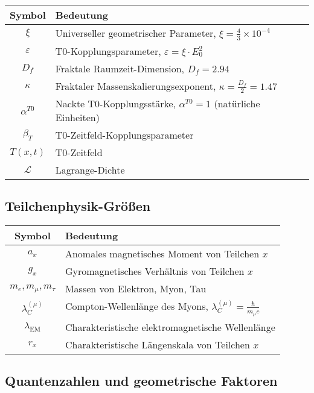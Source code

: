 \documentclass[12pt,a4paper]{article}
\numberwithin{equation}{section}
\newcommand{\xipar}{\xi}
\newcommand{\epsilonT}{\varepsilon}
\newcommand{\alphaT}{\alpha^{T0}}
\newcommand{\kappaT}{\kappa}
\newcommand{\calL}{\mathcal{L}}
\newcommand{\Df}{D_f}
\newcommand{\Eo}{E_0}
\newcommand{\lambdaC}{\lambda_C}
\newcommand{\lambdaEM}{\lambda_{\text{EM}}}
\begin{document}
	\begin{longtable}{cl}
		\toprule
		\textbf{Symbol} & \textbf{Bedeutung} \\
		\midrule
		$\xipar$ & Universeller geometrischer Parameter, $\xipar = \frac{4}{3} \times 10^{-4}$ \\
		$\epsilonT$ & T0-Kopplungsparameter, $\epsilonT = \xipar \cdot \Eo^2$ \\
		$\Df$ & Fraktale Raumzeit-Dimension, $\Df = 2.94$ \\
		$\kappaT$ & Fraktaler Massenskalierungsexponent, $\kappaT = \frac{\Df}{2} = 1.47$ \\
		$\alphaT$ & Nackte T0-Kopplungsstärke, $\alphaT = 1$ (natürliche Einheiten) \\
		$\beta_T$ & T0-Zeitfeld-Kopplungsparameter \\
		$T(x,t)$ & T0-Zeitfeld \\
		$\calL$ & Lagrange-Dichte \\
		\bottomrule
	\end{longtable}
	
	\subsection{Teilchenphysik-Größen}
	
	\begin{longtable}{cl}
		\toprule
		\textbf{Symbol} & \textbf{Bedeutung} \\
		\midrule
		$a_x$ & Anomales magnetisches Moment von Teilchen $x$ \\
		$g_x$ & Gyromagnetisches Verhältnis von Teilchen $x$ \\
		$m_e, m_\mu, m_\tau$ & Massen von Elektron, Myon, Tau \\
		$\lambdaC^{(\mu)}$ & Compton-Wellenlänge des Myons, $\lambdaC^{(\mu)} = \frac{\hbar}{m_\mu c}$ \\
		$\lambdaEM$ & Charakteristische elektromagnetische Wellenlänge \\
		$r_x$ & Charakteristische Längenskala von Teilchen $x$ \\
		\bottomrule
	\end{longtable}
	
	\subsection{Quantenzahlen und geometrische Faktoren}
	
\end{document}
